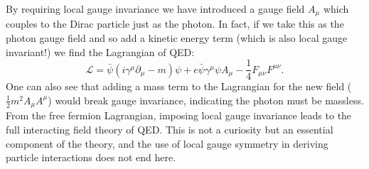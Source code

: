 By requiring local gauge invariance we have introduced a gauge field $A_\mu$ which couples to the Dirac particle just as the photon. In fact, if we take this as the photon gauge field and so add a kinetic energy term (which is also local gauge invariant!) we find the Lagrangian of QED: 
\begin{equation}
\mathcal{L} = \bar{\psi}(i\gamma^\mu\partial_\mu-m)\psi + e\bar{\psi}\gamma^\mu\psi A_\mu -\frac{1}{4} F_{\mu\nu}F^{\mu\nu}.
\end{equation}
One can also see that adding a mass term to the Lagrangian for the new field ($\frac{1}{2}m^2A_\mu A^\mu$) would break gauge invariance, indicating the photon must be massless. From the free fermion Lagrangian, imposing local gauge invariance leads to the full interacting field theory of QED. This is not a curiosity but an essential component of the theory, and the use of local gauge symmetry in deriving particle interactions does not end here.


